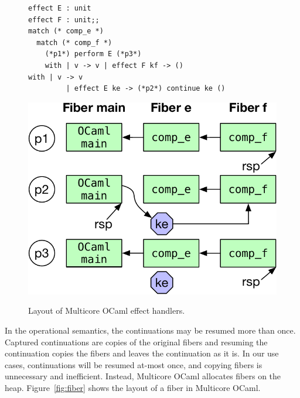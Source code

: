 \documentclass[sigplan,10pt,review,anonymous]{acmart}\settopmatter{printfolios=true,printccs=false,printacmref=false}
\begin{document}
\begin{figure}
\begin{minipage}{0.64\linewidth}
\begin{minipage}{\linewidth}
    \label{fig:mcstack}
    \vspace{2mm}
  \end{minipage}
  \begin{minipage}{0.55\linewidth}
    \begin{lstlisting}
effect E : unit
effect F : unit;;
match (* comp_e *)
  match (* comp_f *)
    (*p1*) perform E (*p3*)
	with | v -> v | effect F kf -> ()
with | v -> v
		 | effect E ke -> (*p2*) continue ke ()
    \end{lstlisting}
		\label{code:effimpl}
  \end{minipage}
  \begin{minipage}{0.44\linewidth}
    \centering
    \includegraphics[scale=0.42]{figures/fiber_handler}
    \label{fig:fiber_handler}
  \end{minipage}
\end{minipage}
\vspace{-2mm}
\caption{Layout of Multicore OCaml effect handlers.}
\vspace{-3mm}
\end{figure}

In the operational semantics, the continuations may be resumed more than once.
Captured continuations are copies of the original fibers and resuming the
continuation copies the fibers and leaves the continuation as it is. In our use
cases, continuations will be resumed at-most once, and copying fibers is
unnecessary and inefficient. Instead, Multicore OCaml allocates fibers on the
heap. Figure~\ref{fig:fiber} shows the layout of a fiber in Multicore OCaml.
\end{document}
